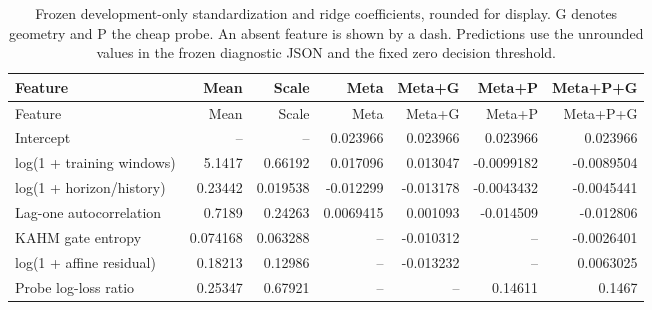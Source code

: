 {\small\setlength{\tabcolsep}{4pt}
\begin{longtable}{lrrrrrr}
\caption{Frozen development-only standardization and ridge coefficients, rounded for display. G denotes geometry and P the cheap probe. An absent feature is shown by a dash. Predictions use the unrounded values in the frozen diagnostic JSON and the fixed zero decision threshold.}\label{tab:diagnostic-coefficients}\\
\toprule
Feature & Mean & Scale & Meta & Meta+G & Meta+P & Meta+P+G \\
\midrule
\endfirsthead
\toprule
Feature & Mean & Scale & Meta & Meta+G & Meta+P & Meta+P+G \\
\midrule
\endhead
Intercept & -- & -- & 0.023966 & 0.023966 & 0.023966 & 0.023966 \\
log(1 + training windows) & 5.1417 & 0.66192 & 0.017096 & 0.013047 & -0.0099182 & -0.0089504 \\
log(1 + horizon/history) & 0.23442 & 0.019538 & -0.012299 & -0.013178 & -0.0043432 & -0.0045441 \\
Lag-one autocorrelation & 0.7189 & 0.24263 & 0.0069415 & 0.001093 & -0.014509 & -0.012806 \\
KAHM gate entropy & 0.074168 & 0.063288 & -- & -0.010312 & -- & -0.0026401 \\
log(1 + affine residual) & 0.18213 & 0.12986 & -- & -0.013232 & -- & 0.0063025 \\
Probe log-loss ratio & 0.25347 & 0.67921 & -- & -- & 0.14611 & 0.1467 \\
\bottomrule
\end{longtable}
}


